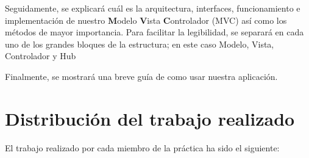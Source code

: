\documentclass[12pt,journal,compsoc]{IEEEtran}
\begin{document}
Seguidamente, se explicará cuál es la arquitectura, interfaces, funcionamiento e implementación de nuestro \textbf{M}odelo \textbf{V}ista \textbf{C}ontrolador (MVC) así como los métodos de mayor importancia. Para facilitar la legibilidad, se separará en cada uno de los grandes bloques de la estructura; en este caso Modelo, Vista, Controlador y Hub\bigskip

Finalmente, se mostrará una breve guía de como usar nuestra aplicación.






\section{Distribución del trabajo realizado}

El trabajo realizado por cada miembro de la práctica ha sido el siguiente:
\end{document}

